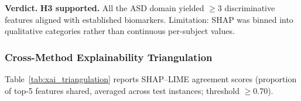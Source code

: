 

\textbf{Verdict.} \textbf{H3 supported.} All the ASD domain yielded $\geq$3 discriminative features aligned with established biomarkers. Limitation: SHAP was binned into qualitative categories rather than continuous per-subject values.

\subsubsection{Cross-Method Explainability Triangulation}

Table~\ref{tab:xai_triangulation} reports SHAP--LIME agreement scores (proportion of top-5 features shared, averaged across test instances; threshold $\geq$0.70).

